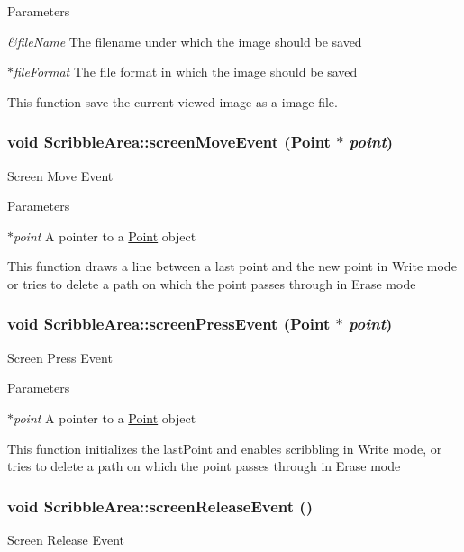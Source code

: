 \begin{DoxyParams}{Parameters}
\item[{\em \&fileName}]The filename under which the image should be saved \item[{\em $\ast$fileFormat}]The file format in which the image should be saved\end{DoxyParams}
This function save the current viewed image as a image file. \hypertarget{classScribbleArea_a457cc291cee3a2d59069bc81caf95e24}{
\subsubsection[{screenMoveEvent}]{\setlength{\rightskip}{0pt plus 5cm}void ScribbleArea::screenMoveEvent ({\bf Point} $\ast$ {\em point})}}
\label{classScribbleArea_a457cc291cee3a2d59069bc81caf95e24}
Screen Move Event


\begin{DoxyParams}{Parameters}
\item[{\em $\ast$point}]A pointer to a \hyperlink{classPoint}{Point} object\end{DoxyParams}
This function draws a line between a last point and the new point in Write mode or tries to delete a path on which the point passes through in Erase mode \hypertarget{classScribbleArea_a5c5e5eee9a891bc7b6fc107bd1d356cb}{
\subsubsection[{screenPressEvent}]{\setlength{\rightskip}{0pt plus 5cm}void ScribbleArea::screenPressEvent ({\bf Point} $\ast$ {\em point})}}
\label{classScribbleArea_a5c5e5eee9a891bc7b6fc107bd1d356cb}
Screen Press Event


\begin{DoxyParams}{Parameters}
\item[{\em $\ast$point}]A pointer to a \hyperlink{classPoint}{Point} object\end{DoxyParams}
This function initializes the lastPoint and enables scribbling in Write mode, or tries to delete a path on which the point passes through in Erase mode \hypertarget{classScribbleArea_a8fe830a4895773885bb2ed65dda875f5}{
\subsubsection[{screenReleaseEvent}]{\setlength{\rightskip}{0pt plus 5cm}void ScribbleArea::screenReleaseEvent ()}}
\label{classScribbleArea_a8fe830a4895773885bb2ed65dda875f5}
Screen Release Event

